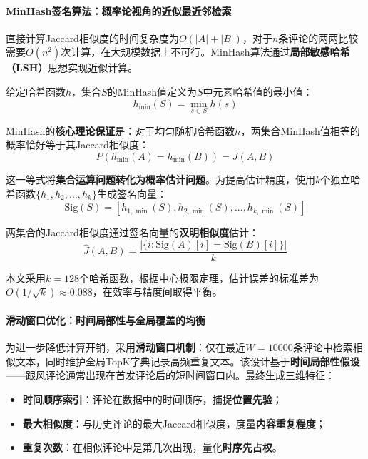 \documentclass[10pt]{article}
\begin{document}
\paragraph{MinHash签名算法：概率论视角的近似最近邻检索}
直接计算Jaccard相似度的时间复杂度为$O(|A| + |B|)$，对于$n$条评论的两两比较需要$O(n^2)$次计算，在大规模数据上不可行。MinHash算法\cite{broder1997resemblance}通过\textbf{局部敏感哈希（LSH）}思想实现近似计算。

给定哈希函数$h$，集合$S$的MinHash值定义为$S$中元素哈希值的最小值：
\begin{equation}
h_{\min}(S) = \min_{s \in S} h(s)
\end{equation}

MinHash的\textbf{核心理论保证}是：对于均匀随机哈希函数$h$，两集合MinHash值相等的概率恰好等于其Jaccard相似度：
\begin{equation}
P(h_{\min}(A) = h_{\min}(B)) = J(A, B)
\end{equation}

这一等式将\textbf{集合运算问题转化为概率估计问题}。为提高估计精度，使用$k$个独立哈希函数$\{h_1, h_2, ..., h_k\}$生成签名向量：
\begin{equation}
\text{Sig}(S) = [h_{1,\min}(S), h_{2,\min}(S), ..., h_{k,\min}(S)]
\end{equation}

两集合的Jaccard相似度通过签名向量的\textbf{汉明相似度}估计：
\begin{equation}
\hat{J}(A, B) = \frac{|\{i : \text{Sig}(A)[i] = \text{Sig}(B)[i]\}|}{k}
\end{equation}

本文采用$k=128$个哈希函数，根据中心极限定理，估计误差的标准差为$O(1/\sqrt{k}) \approx 0.088$，在效率与精度间取得平衡。

\paragraph{滑动窗口优化：时间局部性与全局覆盖的均衡}
为进一步降低计算开销，采用\textbf{滑动窗口机制}：仅在最近$W=10000$条评论中检索相似文本，同时维护全局TopK字典记录高频重复文本。该设计基于\textbf{时间局部性假设}——跟风评论通常出现在首发评论后的短时间窗口内。最终生成三维特征：
\begin{itemize}[leftmargin=*]
    \item \textbf{时间顺序索引}：评论在数据中的时间顺序，捕捉\textbf{位置先验}；
    \item \textbf{最大相似度}：与历史评论的最大Jaccard相似度，度量\textbf{内容重复程度}；
    \item \textbf{重复次数}：在相似评论中是第几次出现，量化\textbf{时序先占权}。
\end{itemize}
\end{document}
